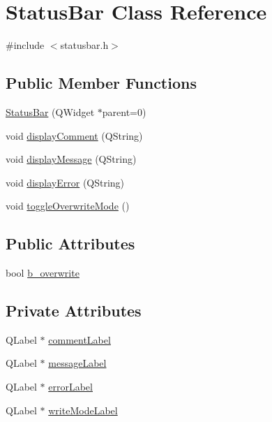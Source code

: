 \hypertarget{classStatusBar}{
\section{StatusBar Class Reference}
\label{classStatusBar}
}


{\ttfamily \#include $<$statusbar.h$>$}

\subsection*{Public Member Functions}
\begin{DoxyCompactItemize}
\item 
\hyperlink{classStatusBar_a4fd786b1103f4a642f5b62fffbc07716}{StatusBar} (QWidget $\ast$parent=0)
\item 
void \hyperlink{classStatusBar_a9eaac6dc5520cf2b8967988be4f00e2c}{displayComment} (QString)
\item 
void \hyperlink{classStatusBar_a765d7e2cfa11bea3156ad980a845f929}{displayMessage} (QString)
\item 
void \hyperlink{classStatusBar_a5bd7bdcfb646d9cbb522e7083cc6ae67}{displayError} (QString)
\item 
void \hyperlink{classStatusBar_ae6593a11684b2263ccc2f7c2acefa7fa}{toggleOverwriteMode} ()
\end{DoxyCompactItemize}
\subsection*{Public Attributes}
\begin{DoxyCompactItemize}
\item 
bool \hyperlink{classStatusBar_afab52abf9f79f1a7f3f0345ea2054d68}{b\_\-overwrite}
\end{DoxyCompactItemize}
\subsection*{Private Attributes}
\begin{DoxyCompactItemize}
\item 
QLabel $\ast$ \hyperlink{classStatusBar_a154eb97a6360923937dc444f68e4fdf9}{commentLabel}
\item 
QLabel $\ast$ \hyperlink{classStatusBar_a75bb9f05dd0058406ad412b0aa04d1e7}{messageLabel}
\item 
QLabel $\ast$ \hyperlink{classStatusBar_a4b649a765f9858eb5432ae641ed8ae5e}{errorLabel}
\item 
QLabel $\ast$ \hyperlink{classStatusBar_ac733bf5674b8d1fcbef6e0ba33346a7c}{writeModeLabel}
\end{DoxyCompactItemize}


